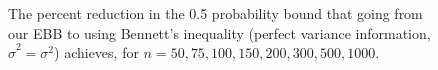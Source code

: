 \begin{figure}[]{}
	\vspace{-10pt}
	\caption[The percent reduction our EBB could yet achieve]{The percent reduction in the 0.5 probability bound that going from our EBB to using Bennett's inequality (perfect variance information, $\hat{\sigma}^2 = \sigma^2$) achieves, for $n=50,75,100,150,200,300,500,1000$.}
	\label{biggraph4}
\end{figure}
